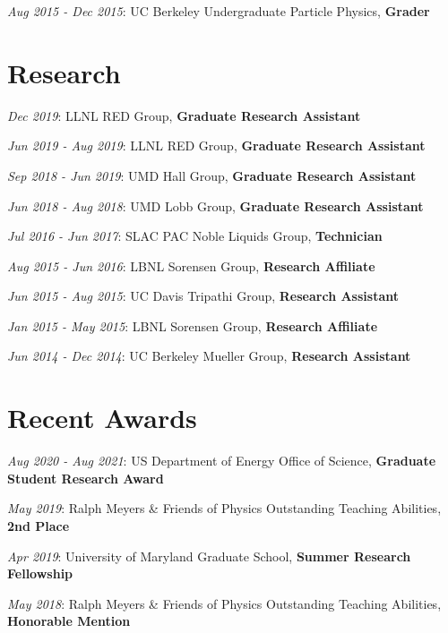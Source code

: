 \documentclass[
  10pt,
]{scrartcl}
\begin{document}
\textcolor{mygray}{\textit{Aug 2015 - Dec 2015}}: UC Berkeley
Undergraduate Particle Physics, \textbf{Grader}

\hypertarget{fa-atom-research}{%
\section{\texorpdfstring{
Research}{ Research}}\label{fa-atom-research}}

\textcolor{mygray}{\textit{Dec 2019}}: LLNL RED Group, \textbf{Graduate
Research Assistant}

\textcolor{mygray}{\textit{Jun 2019 - Aug 2019}}: LLNL RED Group,
\textbf{Graduate Research Assistant}

\textcolor{mygray}{\textit{Sep 2018 - Jun 2019}}: UMD Hall Group,
\textbf{Graduate Research Assistant}

\textcolor{mygray}{\textit{Jun 2018 - Aug 2018}}: UMD Lobb Group,
\textbf{Graduate Research Assistant}

\textcolor{mygray}{\textit{Jul 2016 - Jun 2017}}: SLAC PAC Noble Liquids
Group, \textbf{Technician}

\textcolor{mygray}{\textit{Aug 2015 - Jun 2016}}: LBNL Sorensen Group,
\textbf{Research Affiliate}

\textcolor{mygray}{\textit{Jun 2015 - Aug 2015}}: UC Davis Tripathi
Group, \textbf{Research Assistant}

\textcolor{mygray}{\textit{Jan 2015 - May 2015}}: LBNL Sorensen Group,
\textbf{Research Affiliate}

\textcolor{mygray}{\textit{Jun 2014 - Dec 2014}}: UC Berkeley Mueller
Group, \textbf{Research Assistant}

\hypertarget{fa-trophy-recent-awards}{%
\section{\texorpdfstring{ Recent
Awards}{ Recent Awards}}\label{fa-trophy-recent-awards}}

\textcolor{mygray}{\textit{Aug 2020 - Aug 2021}}: US Department of
Energy Office of Science, \textbf{Graduate Student Research Award}

\textcolor{mygray}{\textit{May 2019}}: Ralph Meyers \& Friends of
Physics Outstanding Teaching Abilities, \textbf{2nd Place}

\textcolor{mygray}{\textit{Apr 2019}}: University of Maryland Graduate
School, \textbf{Summer Research Fellowship}

\textcolor{mygray}{\textit{May 2018}}: Ralph Meyers \& Friends of
Physics Outstanding Teaching Abilities, \textbf{Honorable Mention}
\end{document}
